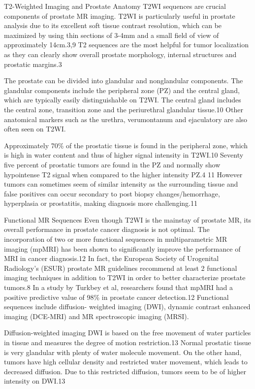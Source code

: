  T2-Weighted Imaging and Prostate Anatomy
 T2WI sequences are crucial components of prostate MR imaging.  T2WI is particularly useful in prostate analysis due to its excellent soft tissue contrast resolution, which can be maximized by using thin sections of 3-4mm and a small field of view of approximately 14cm.3,9 T2 sequences are the most helpful for tumor localization as they can clearly show overall prostate morphology, internal structures and prostatic margins.3

 The prostate can be divided into glandular and nonglandular components. The glandular components include the peripheral zone (PZ) and the central gland, which are typically easily distinguishable on T2WI. The central gland includes the central zone, transition zone and the periurethral glandular tissue.10 Other anatomical markers such as the urethra, verumontanum and ejaculatory are also often seen on T2WI. 

 Approximately 70\% of the prostatic tissue is found in the peripheral zone, which is high in water content and thus of higher signal intensity in T2WI.10 Seventy five percent of prostatic tumors are found in the PZ and normally show hypointense T2 signal when compared to the higher intensity PZ.4 11 However tumors can sometimes seem of similar intensity as the surrounding tissue and false positives can occur secondary to post biopsy changes/hemorrhage, hyperplasia or prostatitis, making diagnosis more challenging.11 

 Functional MR Sequences
 Even though T2WI is the mainstay of prostate MR, its overall performance in prostate cancer diagnosis is not optimal. The incorporation of two or more functional sequences in multiparametric MR imaging (mpMRI) has been shown to significantly improve the performance of MRI in cancer diagnosis.12 In fact, the European Society of Urogenital Radiology’s (ESUR) prostate MR guidelines recommend at least 2 functional imaging techniques in addition to T2WI in order to better characterize prostate tumors.8 In a study by Turkbey et al, researchers found that mpMRI had a positive predictive value of 98\% in prostate cancer detection.12 Functional sequences include diffusion- weighted imaging (DWI), dynamic contrast enhanced imaging (DCE-MRI) and MR spectroscopic imaging (MRSI). 

 Diffusion-weighted imaging
 DWI is based on the free movement of water particles in tissue and measures the degree of motion restriction.13 Normal prostatic tissue is very glandular with plenty of water molecule movement. On the other hand, tumors have high cellular density and restricted water movement, which leads to decreased diffusion. Due to this restricted diffusion, tumors seem to be of higher intensity on DWI.13


